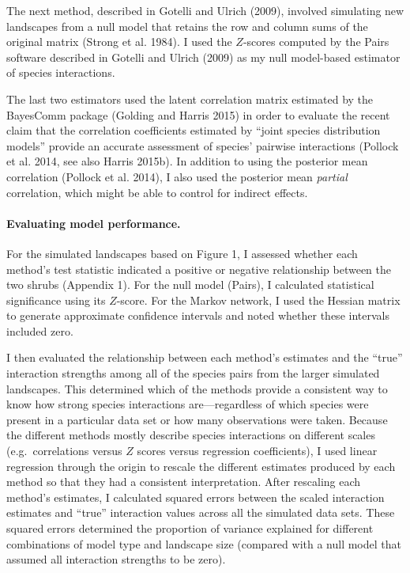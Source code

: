 \documentclass[12pt,]{article}
\begin{document}
\begin{spacing}{1.9}
\begin{flushleft}
The next method, described in Gotelli and Ulrich (2009), involved
simulating new landscapes from a null model that retains the row and
column sums of the original matrix (Strong et al. 1984). I used the
\(Z\)-scores computed by the Pairs software described in Gotelli and
Ulrich (2009) as my null model-based estimator of species interactions.

The last two estimators used the latent correlation matrix estimated by
the BayesComm package (Golding and Harris 2015) in order to evaluate the
recent claim that the correlation coefficients estimated by ``joint
species distribution models'' provide an accurate assessment of species'
pairwise interactions (Pollock et al. 2014, see also Harris 2015b). In
addition to using the posterior mean correlation (Pollock et al. 2014),
I also used the posterior mean \emph{partial} correlation, which might
be able to control for indirect effects.

\paragraph{Evaluating model
performance.}\label{evaluating-model-performance.}

For the simulated landscapes based on Figure 1, I assessed whether each
method's test statistic indicated a positive or negative relationship
between the two shrubs (Appendix 1). For the null model (Pairs), I
calculated statistical significance using its \(Z\)-score. For the
Markov network, I used the Hessian matrix to generate approximate
confidence intervals and noted whether these intervals included zero.

I then evaluated the relationship between each method's estimates and
the ``true'' interaction strengths among all of the species pairs from
the larger simulated landscapes. This determined which of the methods
provide a consistent way to know how strong species interactions
are---regardless of which species were present in a particular data set
or how many observations were taken. Because the different methods
mostly describe species interactions on different scales
(e.g.~correlations versus \(Z\) scores versus regression coefficients),
I used linear regression through the origin to rescale the different
estimates produced by each method so that they had a consistent
interpretation. After rescaling each method's estimates, I calculated
squared errors between the scaled interaction estimates and ``true''
interaction values across all the simulated data sets. These squared
errors determined the proportion of variance explained for different
combinations of model type and landscape size (compared with a null
model that assumed all interaction strengths to be zero).


\end{flushleft}
\end{spacing}
\end{document}
